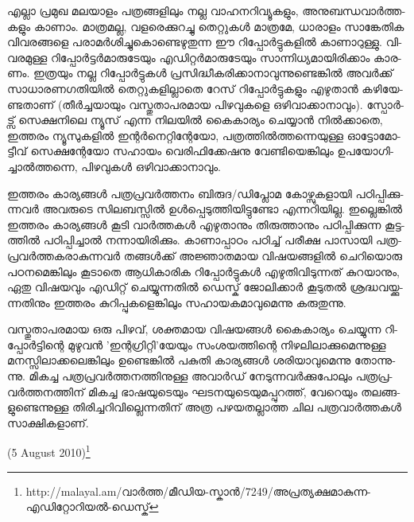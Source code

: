 എ­ല്ലാ പ്ര­മുഖ മല­യാ­ളം പത്ര­ങ്ങ­ളി­ലും നല്ല വാ­ഹ­ന­റി­വ്യൂ­ക­ളും, അനു­ബ­ന്ധ­വാര്‍­ത്ത­ക­ളും കാ­ണാം. മാ­ത്ര­മ­ല്ല, വള­രെ­ക്കു­റ­ച്ചു 
തെ­റ്റു­കള്‍ മാ­ത്ര­മേ, ധാ­രാ­ളം സാ­ങ്കേ­തിക വി­വ­ര­ങ്ങ­ളെ പരാ­മര്‍­ശി­ച്ചു­കൊ­ണ്ടെ­ഴു­തു­ന്ന ഈ റി­പ്പോര്‍­ട്ടു­ക­ളില്‍ കാ­ണാ­റു­ള്ളു. 
വി­വ­ര­മു­ള്ള റി­പ്പോര്‍­ട്ടര്‍­മാ­രു­ടേ­യും എഡി­റ്റര്‍­മാ­രു­ടേ­യും സാ­ന്നി­ധ്യ­മാ­യി­രി­ക്കാം കാ­ര­ണം. ഇത്ര­യും നല്ല റി­പ്പോര്‍­ട്ടു­കള്‍ 
പ്ര­സി­ദ്ധീ­ക­രി­ക്കാ­നാ­വു­ന്നു­ണ്ടെ­ങ്കില്‍ അവര്‍­ക്ക് സാ­ധാ­ര­ണ­ഗ­തി­യില്‍ തെ­റ്റു­ക­ളി­ല്ലാ­തെ റേ­സ് റി­പ്പോര്‍­ട്ടു­ക­ളും എഴു­താന്‍ 
കഴി­യേ­ണ്ട­താ­ണ് (തീര്‍­ച്ച­യാ­യും വസ്തു­താ­പ­ര­മായ പി­ഴ­വു­ക­ളെ ഒഴി­വാ­ക്കാ­നാ­വും­). സ്പോര്‍­ട്സ് സെ­ക്ഷ­നി­ലെ ന്യൂ­സ് എന്ന 
നി­ല­യില്‍ കൈ­കാ­ര്യം ചെ­യ്യാന്‍ നില്‍­ക്കാ­തെ, ഇത്ത­രം ന്യൂ­സു­ക­ളില്‍ ഇന്റര്‍­നെ­റ്റി­ന്റേ­യോ, പത്ര­ത്തില്‍­ത്ത­ന്നെ­യു­ള്ള 
ഓട്ടോ­മോ­ട്ടീ­വ് സെ­ക്ഷ­ന്റേ­യോ സഹാ­യം വെ­രി­ഫി­ക്കേ­ഷ­നു വേ­ണ്ടി­യെ­ങ്കി­ലും ഉപ­യോ­ഗി­ച്ചാല്‍­ത്ത­ന്നെ, പി­ഴ­വു­കള്‍ 
ഒഴി­വാ­ക്കാ­നാ­വും­.

ഇ­ത്ത­രം കാ­ര്യ­ങ്ങള്‍ പത്ര­പ്ര­വര്‍­ത്ത­നം ബി­രു­ദ/­ഡി­പ്ലോമ കോ­ഴ്സു­ക­ളാ­യി പഠി­പ്പി­ക്കു­ന്ന­വര്‍ അവ­രു­ടെ സി­ല­ബ­സ്സില്‍ 
ഉള്‍­പ്പെ­ടു­ത്തി­യി­ട്ടു­ണ്ടോ എന്ന­റി­യി­ല്ല. ഇല്ലെ­ങ്കില്‍ ഇത്ത­രം കാ­ര്യ­ങ്ങള്‍ കൂ­ടി വാര്‍­ത്ത­കള്‍ എഴു­താ­നും തി­രു­ത്താ­നും 
പഠി­പ്പി­ക്കു­ന്ന കൂ­ട്ട­ത്തില്‍ പഠി­പ്പി­ച്ചാല്‍ നന്നാ­യി­രി­ക്കും. കാ­ണാ­പ്പാ­ഠം പഠി­ച്ച് പരീ­ക്ഷ പാ­സാ­യി പത്ര­പ്ര­വര്‍­ത്ത­ക­രാ­കു­ന്ന­വര്‍
തങ്ങള്‍­ക്ക് അജ്ഞാ­ത­മായ വി­ഷ­യ­ങ്ങ­ളില്‍ ചെ­റി­യൊ­രു പഠ­ന­മെ­ങ്കി­ലും കൂ­ടാ­തെ ആധി­കാ­രിക റി­പ്പോര്‍­ട്ടു­കള്‍ 
എഴു­തി­വി­ടു­ന്ന­ത് കു­റ­യാ­നും, ഏതു വി­ഷ­യ­വും എഡി­റ്റ് ചെ­യ്യു­ന്ന­തില്‍ ഡെ­സ്ക് ജോ­ലി­ക്കാര്‍ കൂ­ടു­തല്‍ ശ്ര­ദ്ധ­വ­യ്ക്കു­ന്ന­തി­നും 
ഇത്ത­രം കു­റി­പ്പു­ക­ളെ­ങ്കി­ലും സഹാ­യ­ക­മാ­വു­മെ­ന്നു കരു­തു­ന്നു­.

­വ­സ്തു­താ­പ­ര­മായ ഒരു പി­ഴ­വ്, ശക്ത­മായ വി­ഷ­യ­ങ്ങള്‍ കൈ­കാ­ര്യം ചെ­യ്യു­ന്ന റി­പ്പോര്‍­ട്ടി­ന്റെ മു­ഴു­വന്‍ 'ഇ­ന്റ­ഗ്രി­റ്റി­'­യേ­യും 
സം­ശ­യ­ത്തി­ന്റെ നി­ഴ­ലി­ലാ­ക്കു­മെ­ന്നു­ള്ള മന­സ്സി­ലാ­ക്ക­ലെ­ങ്കി­ലും ഉണ്ടെ­ങ്കില്‍ പകു­തി കാ­ര്യ­ങ്ങള്‍ ശരി­യാ­വു­മെ­ന്നു തോ­ന്നു­ന്നു. 
മി­ക­ച്ച പത്ര­പ്ര­വര്‍­ത്ത­ന­ത്തി­നു­ള്ള അവാര്‍­ഡ് നേ­ടു­ന്ന­വര്‍­ക്കു­പോ­ലും പത്ര­പ്ര­വര്‍­ത്ത­ന­ത്തി­ന് മി­ക­ച്ച ഭാ­ഷ­യു­ടെ­യും 
ഘട­ന­യു­ടെ­യു­മ­പ്പു­റ­ത്ത്, വേ­റെ­യും തല­ങ്ങ­ളു­ണ്ടെ­ന്നു­ള്ള തി­രി­ച്ച­റി­വി­ല്ലെ­ന്ന­തി­ന് അത്ര പഴ­യ­ത­ല്ലാ­ത്ത ചില 
പത്ര­വാര്‍­ത്ത­കള്‍ സാ­ക്ഷി­ക­ളാ­ണ്.

(5 August 2010)\footnote{http://malayal.am/വാര്‍ത്ത/മീഡിയ-സ്കാന്‍/7249/അപ്രത്യക്ഷമാകുന്ന-എഡിറ്റോറിയല്‍-ഡെസ്ക്}

\newpage
